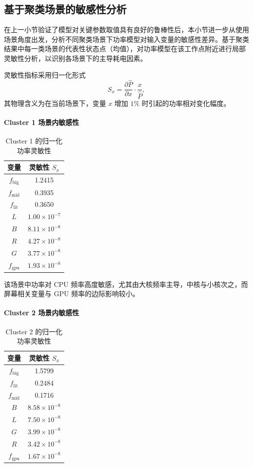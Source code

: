\documentclass[11pt]{article}
\begin{document}
\subsection{基于聚类场景的敏感性分析}

在上一小节验证了模型对关键参数取值具有良好的鲁棒性后，本小节进一步从使用场景角度出发，分析不同聚类场景下功率模型对输入变量的敏感性差异。基于聚类结果中每一类场景的代表性状态点（均值），对功率模型在该工作点附近进行局部灵敏性分析，以识别各场景下的主导耗电因素。

灵敏性指标采用归一化形式
\[
S_x=\frac{\partial \hat{P}}{\partial x}\cdot\frac{x}{\hat{P}},
\]
其物理含义为在当前场景下，变量 $x$ 增加 $1\%$ 时引起的功率相对变化幅度。


\paragraph{Cluster 1 场景内敏感性}

\begin{table}[H]
\centering
\caption{Cluster 1 的归一化功率灵敏性}
\begin{tabular}{cc}
\hline
变量 & 灵敏性 $S_x$ \\ \hline
$f_{\mathrm{big}}$ & 1.2415 \\
$f_{\mathrm{mid}}$ & 0.3935 \\
$f_{\mathrm{lit}}$ & 0.3650 \\
$L$ & $1.00\times10^{-7}$ \\
$B$ & $8.11\times10^{-8}$ \\
$R$ & $4.27\times10^{-8}$ \\
$G$ & $3.77\times10^{-8}$ \\
$f_{\mathrm{gpu}}$ & $1.93\times10^{-8}$ \\ \hline
\end{tabular}
\end{table}

该场景中功率对 CPU 频率高度敏感，尤其由大核频率主导，中核与小核次之，而屏幕相关变量与 GPU 频率的边际影响较小。

\paragraph{Cluster 2 场景内敏感性}

\begin{table}[H]
\centering
\caption{Cluster 2 的归一化功率灵敏性}
\begin{tabular}{cc}
\hline
变量 & 灵敏性 $S_x$ \\ \hline
$f_{\mathrm{big}}$ & 1.5799 \\
$f_{\mathrm{lit}}$ & 0.2484 \\
$f_{\mathrm{mid}}$ & 0.1716 \\
$B$ & $8.58\times10^{-8}$ \\
$L$ & $7.50\times10^{-8}$ \\
$G$ & $3.99\times10^{-8}$ \\
$R$ & $3.42\times10^{-8}$ \\
$f_{\mathrm{gpu}}$ & $1.67\times10^{-8}$ \\ \hline
\end{tabular}
\end{table}
\end{document}
